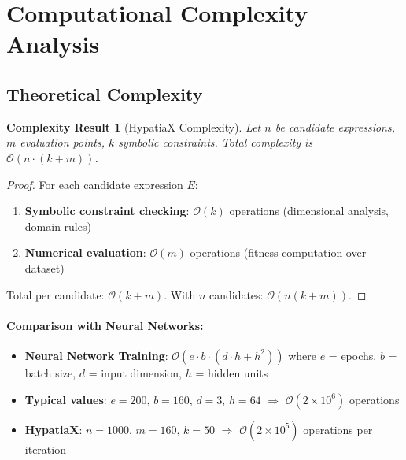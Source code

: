 \documentclass[twoside,11pt]{article}
\newtheorem{complexity}{Complexity Result}
\providecommand{\qed}{\hfill\BlackBox}
\begin{document}


\section{Computational Complexity Analysis}
\label{app:complexity}

\subsection{Theoretical Complexity}

\begin{complexity}[HypatiaX Complexity]
Let $n$ be candidate expressions, $m$ evaluation points, $k$ symbolic constraints. Total complexity is $\mathcal{O}(n \cdot (k + m))$.
\end{complexity}

\begin{proof}
For each candidate expression $E$:
\begin{enumerate}
\item \textbf{Symbolic constraint checking}: $\mathcal{O}(k)$ operations (dimensional analysis, domain rules)
\item \textbf{Numerical evaluation}: $\mathcal{O}(m)$ operations (fitness computation over dataset)
\end{enumerate}

Total per candidate: $\mathcal{O}(k + m)$. With $n$ candidates: $\mathcal{O}(n(k + m))$. \qed
\end{proof}

\paragraph{Comparison with Neural Networks:}
\begin{itemize}
\item \textbf{Neural Network Training}: $\mathcal{O}(e \cdot b \cdot (d \cdot h + h^2))$ where $e$ = epochs, $b$ = batch size, $d$ = input dimension, $h$ = hidden units
\item \textbf{Typical values}: $e=200$, $b=160$, $d=3$, $h=64$ $\Rightarrow$ $\mathcal{O}(2 \times 10^6)$ operations
\item \textbf{HypatiaX}: $n=1000$, $m=160$, $k=50$ $\Rightarrow$ $\mathcal{O}(2 \times 10^5)$ operations per iteration
\end{itemize}
\end{document}
